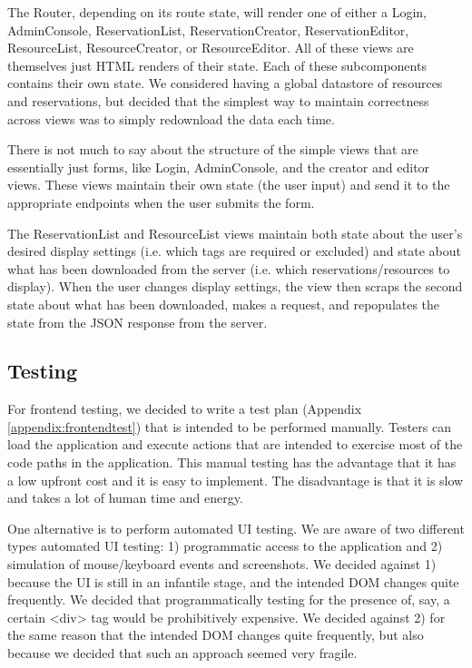 \documentclass[12pt]{article}
\begin{document}
The Router, depending on its route state, will render one of either a Login, AdminConsole, ReservationList, ReservationCreator, ReservationEditor, ResourceList, ResourceCreator, or ResourceEditor. All of these views are themselves just HTML renders of their state. Each of these subcomponents contains their own state. We considered having a global datastore of resources and reservations, but decided that the simplest way to maintain correctness across views was to simply redownload the data each time.

There is not much to say about the structure of the simple views that are essentially just forms, like Login, AdminConsole, and the creator and editor views. These views maintain their own state (the user input) and send it to the appropriate endpoints when the user submits the form.

The ReservationList and ResourceList views maintain both state about the user's desired display settings (i.e. which tags are required or excluded) and state about what has been downloaded from the server (i.e. which reservations/resources to display). When the user changes display settings, the view then scraps the second state about what has been downloaded, makes a request, and repopulates the state from the JSON response from the server.

\subsection{Testing}
For frontend testing, we decided to write a test plan (Appendix \ref{appendix:frontendtest}) that is intended to be performed manually. Testers can load the application and execute actions that are intended to exercise most of the code paths in the application. This manual testing has the advantage that it has a low upfront cost and it is easy to implement. The disadvantage is that it is slow and takes a lot of human time and energy.

One alternative is to perform automated UI testing. We are aware of two different types automated UI testing: 1) programmatic access to the application and 2) simulation of mouse/keyboard events and screenshots. We decided against 1) because the UI is still in an infantile stage, and the intended DOM changes quite frequently. We decided that programmatically testing for the presence of, say, a certain <div> tag would be prohibitively expensive. We decided against 2) for the same reason that the intended DOM changes quite frequently, but also because we decided that such an approach seemed very fragile.
\end{document}
